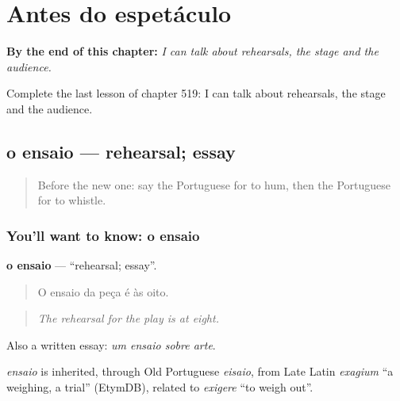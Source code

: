 
\chapter{Antes do espetáculo}
\label{ch:pt-antes-do-espetaculo}

\begin{chapteropening}
\textbf{By the end of this chapter:} \emph{I can talk about rehearsals, the stage and the audience.}

Complete the last lesson of chapter 519: I can talk about rehearsals, the stage and the audience.
\end{chapteropening}

\section[o ensaio]{o ensaio — rehearsal; essay}

\label{lesson:PT-C519-ensaio}



\begin{quote}
Before the new one: say the Portuguese for to hum, then the Portuguese for to whistle.
\end{quote}

\subsection*{You'll want to know: o ensaio}
\textbf{o ensaio} — \textquotedblleft{}rehearsal; essay\textquotedblright{}.

\begin{quote}
O ensaio da peça é às oito.
\end{quote}

\begin{quote}
\emph{The rehearsal for the play is at eight.}
\end{quote}

Also a written essay: \emph{um ensaio sobre arte}.

\begin{cousinweb}
\emph{ensaio} is inherited, through Old Portuguese \emph{eisaio}, from Late Latin \emph{exagium} \textquotedblleft{}a weighing, a trial\textquotedblright{} (EtymDB), related to \emph{exigere} \textquotedblleft{}to weigh out\textquotedblright{}.
\end{cousinweb}

